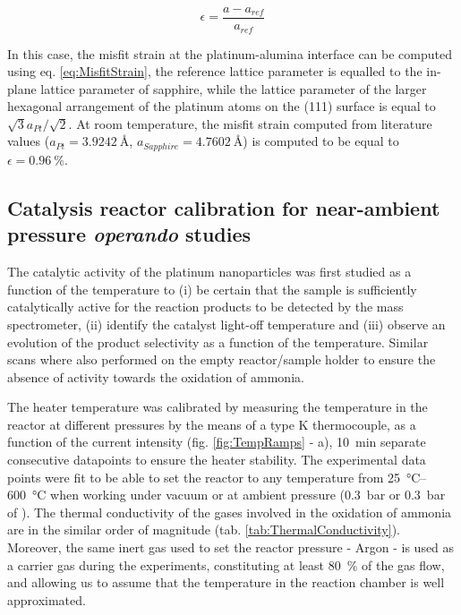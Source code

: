 \begin{equation}
    \epsilon = \frac{a - a_{ref}}{a_{ref}}
    \label{eq:StrainDiffraction}
\end{equation}

In this case, the misfit strain at the platinum-alumina interface can be computed using eq. \ref{eq:MisfitStrain}, the reference lattice parameter is equalled to the in-plane lattice parameter of sapphire, while the lattice parameter of the larger hexagonal arrangement of the platinum atoms on the (111) surface is equal to $\sqrt{3} a_{Pt} / \sqrt{2} $.
At room temperature, the misfit strain computed from literature values ($a_{Pt} = \qty{3.9242}{\angstrom}$, $a_{Sapphire} = \qty{4.7602}{\angstrom}$) is computed to be equal to $\epsilon = \qty{0.96}{\percent}$.

\subsection{Catalysis reactor calibration for near-ambient pressure \textit{operando} studies}

The catalytic activity of the platinum nanoparticles was first studied as a function of the temperature to (i) be certain that the sample is sufficiently catalytically active for the reaction products to be detected by the mass spectrometer, (ii) identify the catalyst light-off temperature and (iii) observe an evolution of the product selectivity as a function of the temperature.
Similar scans where also performed on the empty reactor/sample holder to ensure the absence of activity towards the oxidation of ammonia.

The heater temperature was calibrated by measuring the temperature in the reactor at different pressures by the means of a type K thermocouple, as a function of the current intensity (fig. \ref{fig:TempRamps} - a), \qty{10}{\minute} separate consecutive datapoints to ensure the heater stability.
The experimental data points were fit to be able to set the reactor to any temperature from \qtyrange{25}{600}{\degreeCelsius} when working under vacuum or at ambient pressure (\qty{0.3}{\bar} or \qty{0.3}{\bar} of ).
The thermal conductivity of the gases involved in the oxidation of ammonia are in the similar order of magnitude (tab. \ref{tab:ThermalConductivity}).
Moreover, the same inert gas used to set the reactor pressure - Argon - is used as a carrier gas during the experiments, constituting at least \qty{80}{\percent} of the gas flow, and allowing us to assume that the temperature in the reaction chamber is well approximated.

